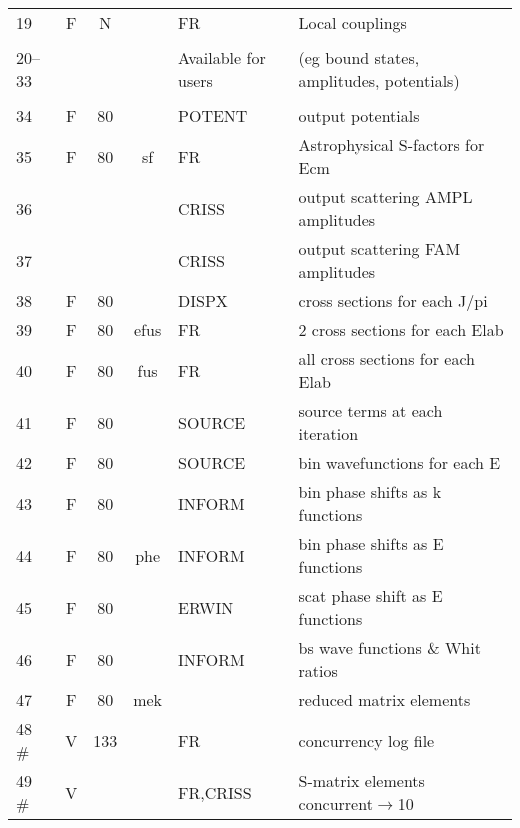 \documentclass[11pt]{article}
\begin{document}
\begin{tabular}{|l | c c c | l | l|}
19    &  F &    N      &    &     FR  &   Local couplings\\
     &  & & & &\\
20--33&    &            &    &     Available for users & (eg bound states, amplitudes, potentials)\\
     &  & & & &\\
34    &  F &    80      &    &     POTENT &   output potentials\\
35    &  F &    80      & sf  &     FR & Astrophysical S-factors for Ecm\\
36    &    &            &    &     CRISS & output scattering AMPL amplitudes\\
37    &    &            &    &     CRISS & output scattering FAM amplitudes\\
38    &  F &    80      &    &     DISPX &    cross sections for each J/pi\\
39    &  F &    80      & efus  &      FR   &    2 cross sections for each Elab\\
40    &  F &    80      & fus  &      FR   &    all cross sections for each Elab\\
41    &  F &    80      &    &     SOURCE &   source terms at each iteration\\
42    &  F &    80      &    &     SOURCE &   bin wavefunctions for each E\\
43    &  F &    80      &    &     INFORM &   bin phase shifts as k functions\\
44    &  F &    80      & phe  &     INFORM &   bin phase shifts as E functions\\
45    &  F &    80      &    &     ERWIN   &  scat phase shift as E functions\\
46    &  F &    80      &    &     INFORM &   bs wave functions \& Whit ratios\\
47    &  F &    80      &   mek &           &   reduced matrix elements \\
48  \#  & V &   133      &    &       FR  & concurrency log file\\
49  \#  & V &        &    &     FR,CRISS & S-matrix elements concurrent$\rightarrow$10\\
\hline
\end{tabular}
\end{document}
